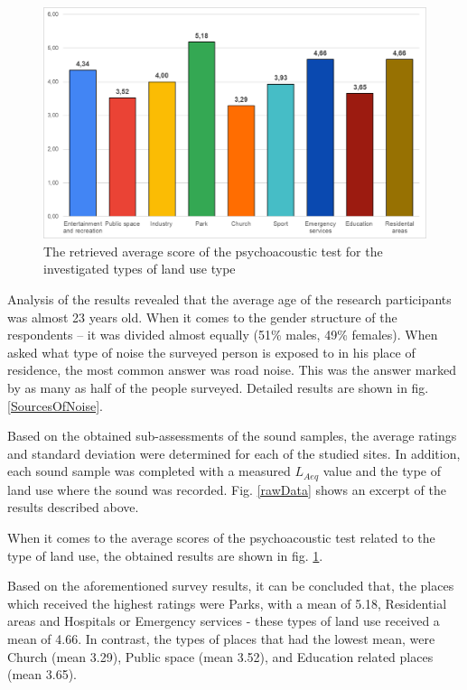 \documentclass[a4paper,10pt]{article}
\begin{document}
\begin{figure}[H]
  \includegraphics[scale=.5]{fig12.png}
  \centering
  \caption{The retrieved average score of the psychoacoustic test for the investigated types of land use type}
  \label{resultPerType}
\end{figure}

\begin{multicols}{2}
  Analysis of the results revealed that the average age of the research
  participants was almost 23 years old. When it comes to the gender structure of
  the respondents – it was divided almost equally (51\% males, 49\% females). When
  asked what type of noise the surveyed person is exposed to in his place of
  residence, the most common answer was road noise. This was the answer marked
  by as many as half of the people surveyed. Detailed results are shown in fig.
  \ref{SourcesOfNoise}.

  Based on the obtained sub-assessments of the sound samples, the average
  ratings and standard deviation were determined for each of the studied sites.
  In addition, each sound sample was completed with a measured $L_{Aeq}$ value
  and the type of land use where the sound was recorded. Fig. \ref{rawData}
  shows an excerpt of the results described above.

  When it comes to the average scores of the psychoacoustic test related to the
  type of land use, the obtained results are shown in fig. \ref{resultPerType}.

  Based on the aforementioned survey results, it can be concluded that, the
  places which received the highest ratings were Parks, with a mean of 5.18,
  Residential areas and Hospitals or Emergency services - these types of land use
  received a mean of 4.66. In contrast, the types of places that had the lowest
  mean, were Church (mean 3.29), Public space (mean 3.52), and Education related
  places (mean 3.65).

\end{multicols}
\end{document}
